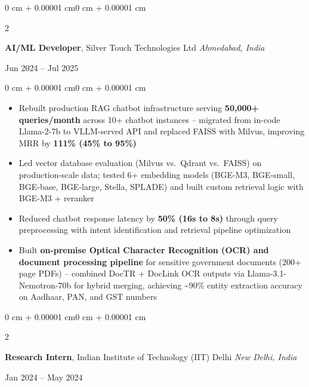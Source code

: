 \documentclass[10pt, letterpaper]{article}
\newenvironment{highlights}{
    \begin{itemize}[
        topsep=0.10 cm,
        parsep=0.10 cm,
        partopsep=0pt,
        itemsep=0pt,
        leftmargin=0 cm + 10pt
    ]
}{
    \end{itemize}
}
\newenvironment{onecolentry}{
    \begin{adjustwidth}{0 cm + 0.00001 cm}{0 cm + 0.00001 cm}
}{
    \end{adjustwidth}
}
\newenvironment{twocolentry}[2][]{
    \onecolentry
    \def\secondColumn{#2}
    \setcolumnwidth{\fill, 5.5 cm}
    \begin{paracol}{2}
}{
    \switchcolumn \raggedleft \secondColumn
    \end{paracol}
    \endonecolentry
}
\begin{document}
        \begin{twocolentry}{
            Jun 2024 -- Jul 2025
        }
            \textbf{AI/ML Developer}, Silver Touch Technologies Ltd \hfill \textit{Ahmedabad, India}
        \end{twocolentry}

        \vspace{0.10 cm}
        \begin{onecolentry}
            \begin{highlights}
                \item Rebuilt production RAG chatbot infrastructure serving \textbf{50,000+ queries/month} across 10+ chatbot instances -- migrated from in-code Llama-2-7b to VLLM-served API and replaced FAISS with Milvus, improving MRR by \textbf{111\% (45\% to 95\%)}
                \item Led vector database evaluation (Milvus vs.\ Qdrant vs.\ FAISS) on production-scale data; tested 6+ embedding models (BGE-M3, BGE-small, BGE-base, BGE-large, Stella, SPLADE) and built custom retrieval logic with BGE-M3 + reranker
                \item Reduced chatbot response latency by \textbf{50\% (16s to 8s)} through query preprocessing with intent identification and retrieval pipeline optimization
                \item Built \textbf{on-premise Optical Character Recognition (OCR) and document processing pipeline} for sensitive government documents (200+ page PDFs) -- combined DocTR + DocLink OCR outputs via Llama-3.1-Nemotron-70b for hybrid merging, achieving \textasciitilde90\% entity extraction accuracy on Aadhaar, PAN, and GST numbers
            \end{highlights}
        \end{onecolentry}

        \vspace{0.2 cm}

        \begin{twocolentry}{
            Jan 2024 -- May 2024
        }
            \textbf{Research Intern}, Indian Institute of Technology (IIT) Delhi \hfill \textit{New Delhi, India}
        \end{twocolentry}
\end{document}
